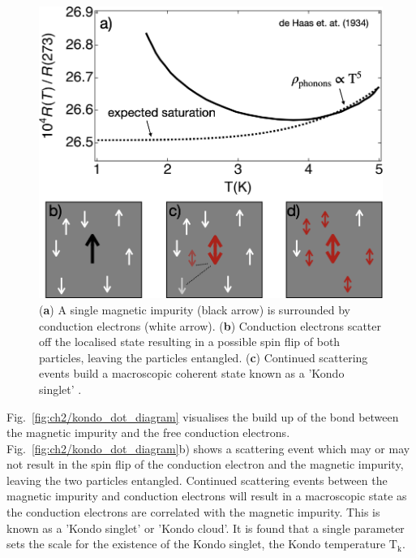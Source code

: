  
\begin{figure}[!hbt]
  \begin{center}
    \includegraphics[width=1.0\textwidth]{figures/ch2/crop_PosterFiguresMaster.006.png}
    \caption[Kondo effect in bulk materials]{\label{fig:ch2/kondo_bulkdiagram} 
    (\textbf{a}) A single magnetic impurity (black arrow) is surrounded by conduction electrons (white arrow). (\textbf{b}) Conduction electrons scatter off the localised state resulting in a possible spin flip of both particles, leaving the particles entangled. (\textbf{c}) Continued scattering events build a macroscopic coherent state known as a 'Kondo singlet' .
      }
  \end{center}
\end{figure}





Fig.~\ref{fig:ch2/kondo_dot_diagram} visualises the build up of the bond between the magnetic impurity and the free conduction electrons. 
Fig.~\ref{fig:ch2/kondo_dot_diagram}b) shows a scattering event which may or may not result in the spin flip of the conduction electron and the magnetic impurity, leaving the two particles entangled. Continued scattering events between the magnetic impurity and conduction electrons will result in a macroscopic state as the conduction electrons are correlated with the magnetic impurity. This is known as a 'Kondo singlet' or 'Kondo cloud'. It is found that a single parameter sets the scale for the existence of the Kondo singlet, the Kondo temperature $\mathrm{T_k}$. 



